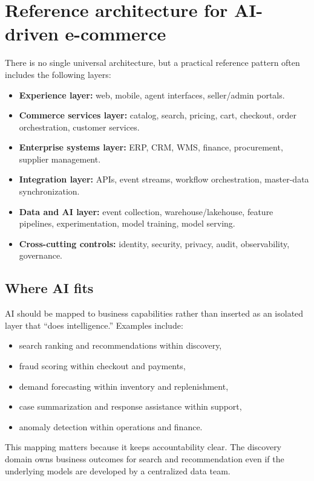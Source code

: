 \section{Reference architecture for AI-driven e-commerce}
There is no single universal architecture, but a practical reference pattern often includes the following layers:
\begin{itemize}
  \item \textbf{Experience layer:} web, mobile, agent interfaces, seller/admin portals.
  \item \textbf{Commerce services layer:} catalog, search, pricing, cart, checkout, order orchestration, customer services.
  \item \textbf{Enterprise systems layer:} ERP, CRM, WMS, finance, procurement, supplier management.
  \item \textbf{Integration layer:} APIs, event streams, workflow orchestration, master-data synchronization.
  \item \textbf{Data and AI layer:} event collection, warehouse/lakehouse, feature pipelines, experimentation, model training, model serving.
  \item \textbf{Cross-cutting controls:} identity, security, privacy, audit, observability, governance.
\end{itemize}

\subsection{Where AI fits}
AI should be mapped to business capabilities rather than inserted as an isolated layer that ``does intelligence.''
Examples include:
\begin{itemize}
  \item search ranking and recommendations within discovery,
  \item fraud scoring within checkout and payments,
  \item demand forecasting within inventory and replenishment,
  \item case summarization and response assistance within support,
  \item anomaly detection within operations and finance.
\end{itemize}

This mapping matters because it keeps accountability clear.
The discovery domain owns business outcomes for search and recommendation even if the underlying models are developed by a centralized data team.

